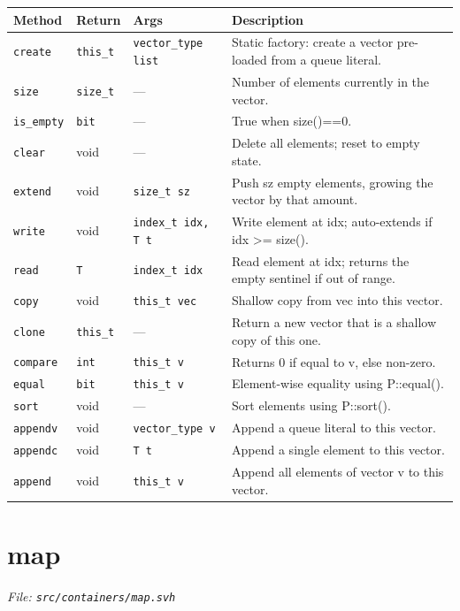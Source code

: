 \documentclass[11pt,letterpaper]{report}
\begin{document}
\begin{xltabular}{\linewidth}{>{\small}p{1.35in} >{\small}p{1.25in} >{\small}p{0.95in} >{\small}X}
\toprule
\textbf{Method} & \textbf{Return} & \textbf{Args} & \textbf{Description} \\
\midrule
\endhead
\bottomrule
\endfoot
\texttt{create} & \texttt{this\_t} & \texttt{vector\_type list} & Static factory: create a vector pre-loaded from a queue literal. \\
\texttt{size} & \texttt{size\_t} & --- & Number of elements currently in the vector. \\
\texttt{is\_empty} & \texttt{bit} & --- & True when size()==0. \\
\texttt{clear} & void & --- & Delete all elements; reset to empty state. \\
\texttt{extend} & void & \texttt{size\_t sz} & Push sz empty elements, growing the vector by that amount. \\
\texttt{write} & void & \texttt{index\_t idx, T t} & Write element at idx; auto-extends if idx \textgreater{}= size(). \\
\texttt{read} & \texttt{T} & \texttt{index\_t idx} & Read element at idx; returns the empty sentinel if out of range. \\
\texttt{copy} & void & \texttt{this\_t vec} & Shallow copy from vec into this vector. \\
\texttt{clone} & \texttt{this\_t} & --- & Return a new vector that is a shallow copy of this one. \\
\texttt{compare} & \texttt{int} & \texttt{this\_t v} & Returns 0 if equal to v, else non-zero. \\
\texttt{equal} & \texttt{bit} & \texttt{this\_t v} & Element-wise equality using P::equal(). \\
\texttt{sort} & void & --- & Sort elements using P::sort(). \\
\texttt{appendv} & void & \texttt{vector\_type v} & Append a queue literal to this vector. \\
\texttt{appendc} & void & \texttt{T t} & Append a single element to this vector. \\
\texttt{append} & void & \texttt{this\_t v} & Append all elements of vector v to this vector. \\
\end{xltabular}

\section{map}
\noindent\small\textit{File: \texttt{src/containers/map.svh}}\par
\end{document}
